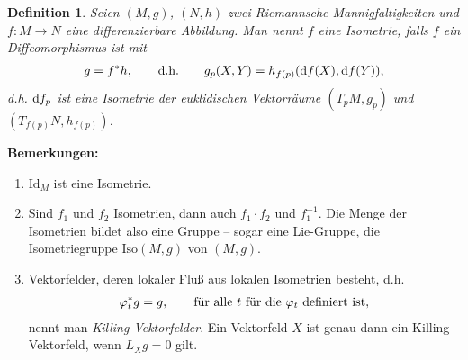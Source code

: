 \documentclass[12pt,a4paper]{article}
\def\Iso{\mathrm{Iso}}
\def\Id{\mathrm{Id}}
\newtheorem{Definition}[Lemma]{Definition}
\begin{document}
\bigskip

\begin{Definition}
Seien $(M,g)$, $(N,h)$ zwei Riemannsche Mannigfaltigkeiten und $f: M\to N$ eine
differenzierbare Abbildung. Man nennt $f$ eine \emph{Isometrie}, falls $f$ ein
Diffeomorphismus ist mit
\begin{align*}
g = f^*h,\qquad \text{d.h.}\qquad
g_p(X,Y) = h_{f(p)}(\mathrm{d}f(X),\mathrm{d}f(Y)),
\end{align*}
d.h. $\mathrm{d}f_p$ ist eine Isometrie der euklidischen Vektorr\"aume $(T_pM,g_p)$ und
$(T_{f(p)}N,h_{f(p)})$.
\end{Definition}

\bigskip

{\bf Bemerkungen:}
\begin{enumerate}
  \item $\Id_M$ ist eine Isometrie.
  \item Sind $f_1$ und $f_2$ Isometrien, dann auch $f_1\cdot f_2$ und
  $f_1^{-1}$. Die Menge der Isometrien bildet also eine Gruppe -- sogar eine
  Lie-Gruppe, die Isometriegruppe $\Iso(M,g)$ von $(M,g)$.
  \item Vektorfelder, deren lokaler Flu\ss{} aus lokalen Isometrien besteht,
  d.h.
  \begin{align*}
  \varphi_t^* g = g,\qquad \text{f\"ur alle }t \text{ f\"ur die }\varphi_t\text{
  definiert ist},
  \end{align*}
  nennt man {\it Killing Vektorfelder}. Ein Vektorfeld $X$ ist genau dann ein Killing Vektorfeld,
  wenn $L_Xg = 0$ gilt.
\end{enumerate}

\bigskip
\end{document}

